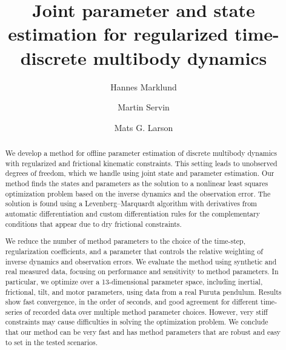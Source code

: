 \documentclass[preprint,12pt]{elsarticle}
\numberwithin{equation}{section}
\begin{document}
\begin{frontmatter}
    \title{Joint parameter and state estimation for regularized time-discrete multibody dynamics}
    
    \author[]{Hannes Marklund}
    \author[]{Martin Servin}
    \author[]{Mats G. Larson}
    

    \begin{abstract}
        We develop a method for offline parameter estimation of discrete multibody dynamics with regularized and frictional kinematic constraints.
        This setting leads to unobserved degrees of freedom, which we handle using joint state and parameter estimation.
        Our method finds the states and parameters as the solution to a nonlinear least squares optimization problem based on the inverse dynamics and the observation error.
        The solution is found using a Levenberg--Marquardt algorithm with derivatives from automatic differentiation and custom differentiation rules for the complementary conditions that appear due to dry frictional constraints.
        
        We reduce the number of method parameters to the choice of the time-step, regularization coefficients, and a parameter that controls the relative weighting of inverse dynamics and observation errors.
        We evaluate the method using synthetic and real measured data, focusing on performance and sensitivity to method parameters.
        In particular, we optimize over a 13-dimensional parameter space, including inertial, frictional, tilt, and motor parameters, using data from a real Furuta pendulum.
        Results show fast convergence, in the order of seconds, and good agreement for different time-series of recorded data over multiple method parameter choices.
        However, very stiff constraints may cause difficulties in solving the optimization problem.
        We conclude that our method can be very fast and has method parameters that are robust and easy to set in the tested scenarios.
    \end{abstract}
    


\end{frontmatter}
\end{document}
